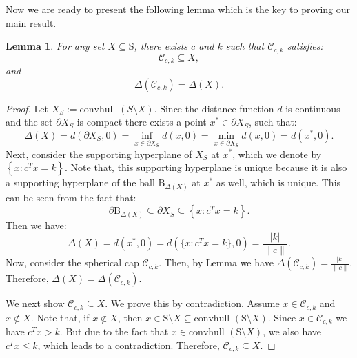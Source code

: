 \documentclass[letterpaper, 10 pt, conference]{ieeeconf}  %
\newcommand{\convhull}{\mbox{convhull } }
\newcommand{\R}{\mathbb{R} }
\newcommand{\conv}{\convhull }
\newcommand{\dist}{d}
\newcommand{\calC}{\mathcal{C}}
\newcommand{\sphere}{\text{S}}
\newcommand{\ball}{\text{B}}
\newtheorem{lemma}[theorem]{Lemma}
\begin{document}
Now we are ready to present the following lemma which is the key to proving our main result.
\begin{lemma}\label{lemma:constructSC}For any set $X \subseteq \sphere$, there exists $c$ and $k$ such that $\calC_{c,k}$ satisfies:
\begin{equation*}\calC_{c,k} \subseteq X,
\end{equation*}
 and
\begin{equation}\Delta(\calC_{c,k}) = \Delta(X).
\end{equation}
\end{lemma}

\begin{proof} Let $X_S := \conv(S \setminus X)$.
Since the distance function $\dist$ is continuous and the set $\partial X_S$ is compact there exists a point $x^* \in \partial X_S$, such that:
\begin{equation}\label{deltaSupporting}\Delta(X) = \dist(\partial X_S, 0) = \inf_{x \in \partial X_S}\dist(x, 0) = \min_{x \in \partial X_S}\dist(x, 0) = \dist(x^*, 0).\end{equation} 
Next, consider the supporting hyperplane of $X_S$ at $x^*$, which we denote by $\left\{x : c^Tx = k\right\}$. Note that, this supporting hyperplane is unique because it is also a supporting hyperplane of the ball $\ball_{\Delta(X)}$ at $x^*$ as well, which is unique. This can be seen from the fact that:
\begin{equation*} \partial \ball_{\Delta(X)} \subseteq \partial X_S \subseteq \left\{x : c^Tx = k\right\}.\end{equation*}
Then we have:
\begin{equation*}\Delta(X) =  \dist(x^*, 0) = \dist(\{x : c^Tx = k\}, 0) = \frac{|k|}{\|c\|}.
\end{equation*}
Now, consider the spherical cap $\calC_{c,k}$. Then, by Lemma \label{lemma:delta2} we have
$\Delta(\calC_{c,k}) = \frac{|k|}{\|c\|}$. Therefore, $\Delta(X) = \Delta(\calC_{c,k})$.


We next show $\calC_{c, k} \subseteq X$. We prove this by contradiction. Assume $x \in \calC_{c,k}$ and $x \notin X$. Note that, if $x \notin X$, then $x \in \sphere \setminus X \subseteq \conv(\sphere \setminus X).$ Since $x \in \calC_{c,k}$ we have $c^Tx>k$. But due to the fact that $x \in \conv(\sphere \setminus X)$, we also have $c^Tx \leq k$, which leads to a contradiction. Therefore, $\calC_{c, k} \subseteq X$. 
\end{proof}
\end{document}
